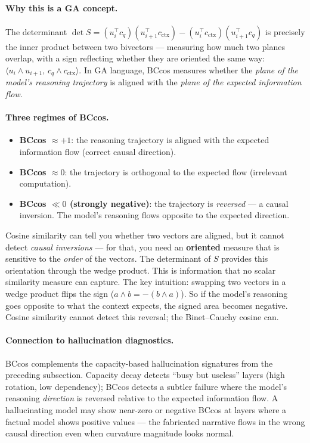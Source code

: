 \documentclass[11pt, twoside, openright]{memoir}
\newcommand{\op}{\wedge}          %
\numberwithin{equation}{chapter}
\begin{document}
\paragraph{Why this is a GA concept.}
The determinant $\det S = (u_i^\top c_q)(u_{i+1}^\top c_{\text{ctx}})
- (u_i^\top c_{\text{ctx}})(u_{i+1}^\top c_q)$ is precisely the
inner product between two bivectors --- measuring how much two planes overlap, with a sign reflecting whether they are oriented the same way:
$\langle u_i \op u_{i+1}, \, c_q \op c_{\text{ctx}} \rangle$.  In
GA language, BCcos measures whether the \emph{plane of the model's
reasoning trajectory} is aligned with the \emph{plane of the expected
information flow}.

\paragraph{Three regimes of BCcos.}
\begin{itemize}[nosep]
\item \textbf{BCcos $\approx +1$}: the reasoning trajectory is aligned
  with the expected information flow (correct causal direction).
\item \textbf{BCcos $\approx 0$}: the trajectory is orthogonal to
  the expected flow (irrelevant computation).
\item \textbf{BCcos $\ll 0$ (strongly negative)}: the trajectory is
  \emph{reversed} --- a causal inversion.  The model's reasoning
  flows opposite to the expected direction.
\end{itemize}

\begin{keyidea}
Cosine similarity can tell you whether two vectors are aligned, but it
cannot detect \emph{causal inversions} --- for that, you need an
\textbf{oriented} measure that is sensitive to the \emph{order} of the
vectors.  The determinant of $S$ provides this orientation through the
wedge product.  This is information that no scalar similarity measure
can capture.
The key intuition: swapping two vectors in a wedge product flips the sign ($a \wedge b = -(b \wedge a)$). So if the model's reasoning goes opposite to what the context expects, the signed area becomes negative. Cosine similarity cannot detect this reversal; the Binet--Cauchy cosine can.
\end{keyidea}

\paragraph{Connection to hallucination diagnostics.}
BCcos complements the capacity-based hallucination signatures from the
preceding subsection.  Capacity decay detects ``busy but useless''
layers (high rotation, low dependency); BCcos detects a subtler
failure where the model's reasoning \emph{direction} is reversed
relative to the expected information flow.  A hallucinating model
may show near-zero or negative BCcos at layers where a factual model
shows positive values --- the fabricated narrative flows in the wrong
causal direction even when curvature magnitude looks normal.
\end{document}

